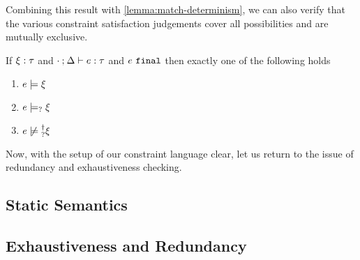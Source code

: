 Combining this result with \autoref{lemma:match-determinism}, we can also verify that the various constraint satisfaction judgements cover all possibilities and are mutually exclusive.

\begin{theorem}
	\label{theorem:exclusive-constraint-satisfaction}
	If $\xi : \tau$ and $\cdot \mathbin{;} \Delta \vdash e : \tau$ and $e ~\mathtt{final}$ then exactly one of the following holds
	\begin{enumerate}
		\item $e \models \xi$
		\item $e \models_{?} \xi$
		\item $\cnotsatisfyormay{e}{\xi}$
	\end{enumerate}
\end{theorem}

Now, with the setup of our constraint language clear, let us return to the issue of redundancy and exhaustiveness checking. 
\subsection{Static Semantics}\label{sec:statics}




\subsection{Exhaustiveness and Redundancy}\label{sec:analyses}


